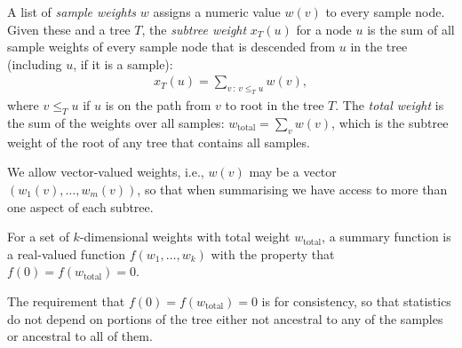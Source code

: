 \documentclass{article}
\newcommand{\iw}{w} %
\newcommand{\tiw}{w_\text{total}} %
\newcommand{\nw}{x} %
\begin{document}
\begin{definition} \label{defn:weights}
    A list of \emph{sample weights} $\iw$ assigns a numeric value $\iw(v)$
    to every sample node.
    Given these and a tree $T$,
    the \emph{subtree weight} $\nw_T(u)$ for a node $u$ is the sum of all sample weights
    of every sample node that is descended from $u$ in the tree (including $u$, if it is a sample):
    \begin{align*}
        \nw_T(u) = \sum_{v \,:\, v \le_T u} \iw(v) ,
    \end{align*}
    where $v \le_T u$ if $u$ is on the path from $v$ to root in the tree $T$.
    The \emph{total weight} is the sum of the weights over all samples:
    $\tiw = \sum_v \iw(v)$, which is the subtree weight of the root of any tree
    that contains all samples.
\end{definition}

We allow vector-valued weights,
i.e., $\iw(v)$ may be a vector $(\iw_1(v), \ldots, \iw_m(v))$,
so that when summarising we have access to more than one aspect of each subtree.

\begin{definition}
    For a set of $k$-dimensional weights with total weight $\tiw$,
    a summary function is a real-valued function $f(w_1, \ldots, w_k)$
    with the property that $f(0) = f(\tiw) = 0$.
\end{definition}

The requirement that $f(0) = f(\tiw) = 0$ is for consistency,
so that statistics do not depend on portions of the tree either not ancestral to any of the samples or ancestral to all
of them.
\end{document}
